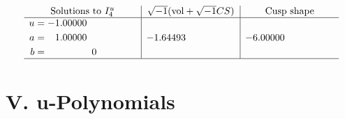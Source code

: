 \documentclass[1p]{elsarticle_modified}
\theoremstyle{definition}
\newcommand{\I}{\sqrt{-1}}
\begin{document}
$$\begin{array}{c|c|c}  
\text{Solutions to }I^u_{4}& \I (\text{vol} + \sqrt{-1}CS) & \text{Cusp shape}\\
 \hline 
\begin{aligned}
u &= -1.00000\phantom{ +0.000000I} \\
a &= \phantom{-}1.00000\phantom{ +0.000000I} \\
b &= \phantom{-0.000000 } 0\end{aligned}
 & -1.64493\phantom{ +0.000000I} & -6.00000\phantom{ +0.000000I}\\
 \hline 
 \end{array}$$\newpage
\newpage\renewcommand{\arraystretch}{1}
\centering \section*{ V. u-Polynomials}
\end{document}
